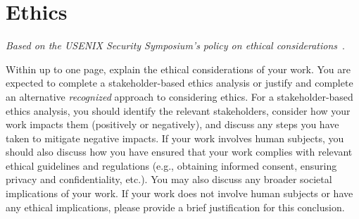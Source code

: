 \begin{table}[H]
    \centering
    \scriptsize
    \label{tab:profile-condition-accuracy}
\end{table}

\iffalse
\section*{Ethics}\label{s:ethical-considerations-appendix}

\emph{Based on the USENIX Security Symposium's policy on ethical considerations}~\cite{secethics}.

Within up to one page, explain the ethical considerations of your work. You are expected to complete a stakeholder-based ethics analysis or justify and complete an alternative \emph{recognized} approach to considering ethics. For a stakeholder-based ethics analysis, you should identify the relevant stakeholders, consider how your work impacts them (positively or negatively), and discuss any steps you have taken to mitigate negative impacts. If your work involves human subjects, you should also discuss how you have ensured that your work complies with relevant ethical guidelines and regulations (e.g., obtaining informed consent, ensuring privacy and confidentiality, etc.). You may also discuss any broader societal implications of your work. If your work does not involve human subjects or have any ethical implications, please provide a brief justification for this conclusion.

